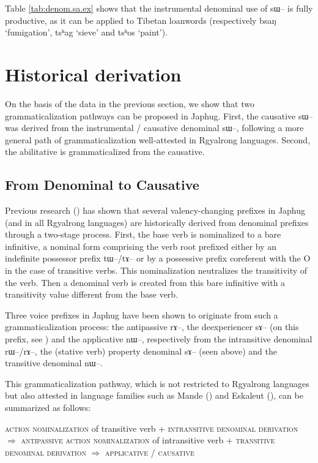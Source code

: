 \documentclass[oldfontcommands,oneside,a4paper,11pt]{article}
\newcommand{\ipa}[1]{{\phon \mbox{#1}}} %
\begin{document}
 Table \ref{tab:denom.sa.ex} shows that the instrumental   denominal use of \ipa{sɯ--} is fully productive, as it can be applied to Tibetan loanwords (respectively \ipa{bsaŋ} `fumigation', \ipa{tsʰag} `sieve' and \ipa{tsʰos} `paint').
 
 

\section{Historical derivation}
On the basis of the data in the previous section, we show that two grammaticalization pathways can be proposed in Japhug. First, the causative \ipa{sɯ--} was derived from the instrumental / causative denominal \ipa{sɯ--}, following a more general path of grammaticalization well-attested in Rgyalrong languages. Second, the abilitative is grammaticalized from the causative.

\subsection{From Denominal to Causative}
Previous research (\citealt{jacques14antipassive}) has shown that several valency-changing prefixes in Japhug (and in all Rgyalrong languages) are historically derived from denominal prefixes through a two-stage process. First, the base verb is nominalized to a bare infinitive, a nominal form comprising the verb root prefixed  either by an indefinite possessor prefix \ipa{tɯ--/tɤ--} or by a possessive prefix coreferent with the O in the case of transitive verbs. This nominalization neutralizes the transitivity of the verb. Then a denominal verb is created from this bare infinitive with a transitivity value different from the base verb. 

Three voice prefixes in Japhug have been shown to originate from such a grammaticalization process: the antipassive \ipa{rɤ--}, the deexperiencer \ipa{sɤ--} (on this prefix, see \citealt{jacques12demotion}) and the applicative \ipa{nɯ--}, respectively from the intransitive denominal \ipa{rɯ--/rɤ--}, the (stative verb) property denominal \ipa{sɤ--} (seen above) and the transitive denominal \ipa{nɯ--}.

This grammaticalization pathway, which is not restricted to Rgyalrong languages but also attested in language families such as Mande (\citealt{creissels12antip}) and Eskaleut (\citealt{fortescue96halftrans}),  can be summarized as follows:


\begin{exe}
\ex \label{ex:pathway}
\glt \textsc{action nominalization} of transitive verb + \textsc{intransitive denominal derivation} $\Rightarrow$ \textsc{antipassive}
\ex
\glt \textsc{action nominalization} of intransitive verb + \textsc{transitive denominal derivation} $\Rightarrow$ \textsc{applicative} / \textsc{causative}
\end{exe}
\end{document}
